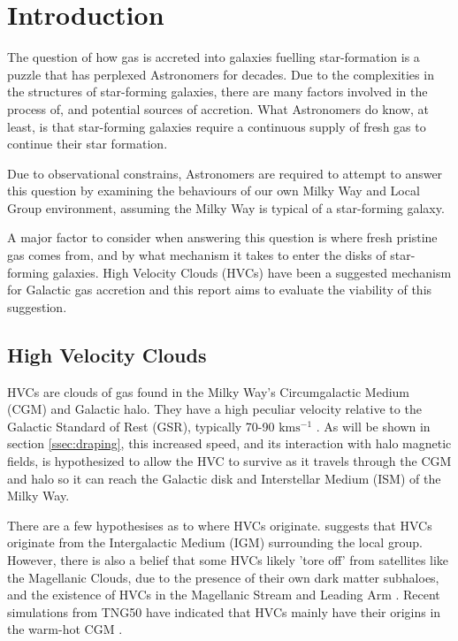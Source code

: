 \chapter{Introduction}
\label{cha:introduction}

The question of how gas is accreted into galaxies fuelling star-formation is a puzzle that has perplexed Astronomers for decades. Due to the complexities in the structures of star-forming galaxies, there are many factors involved in the process of, and potential sources of accretion. What Astronomers do know, at least, is that star-forming galaxies require a continuous supply of fresh gas to continue their star formation.


Due to observational constrains, Astronomers are required to attempt to answer this question by examining the behaviours of our own Milky Way and Local Group environment, assuming the Milky Way is typical of a star-forming galaxy.


A major factor to consider when answering this question is where fresh pristine gas comes from, and by what mechanism it takes to enter the disks of star-forming galaxies. High Velocity Clouds (HVCs) have been a suggested mechanism for Galactic gas accretion and this report aims to evaluate the viability of this suggestion. 


\section{High Velocity Clouds}
\label{sec:hvcs}

HVCs are clouds of gas found in the Milky Way's Circumgalactic Medium (CGM) and Galactic halo. They have a high peculiar velocity relative to the Galactic Standard of Rest (GSR), typically 70-90 $\mathrm{km s^{-1}}$ \citep{ID7, ID8, ID66}. As will be shown in section \ref{ssec:draping}, this increased speed, and its interaction with halo magnetic fields, is hypothesized to allow the HVC to survive as it travels through the CGM and halo so it can reach the Galactic disk and Interstellar Medium (ISM) of the Milky Way.


There are a few hypothesises as to where HVCs originate. \cite{ID66} suggests that HVCs originate from the Intergalactic Medium (IGM) surrounding the local group. However, there is also a belief that some HVCs likely 'tore off' from satellites like the Magellanic Clouds, due to the presence of their own dark matter subhaloes, and the existence of HVCs in the Magellanic Stream and Leading Arm \citep{ID27, ID2}. Recent simulations from TNG50 have indicated that HVCs mainly have their origins in the warm-hot CGM \citep{ID74}.


